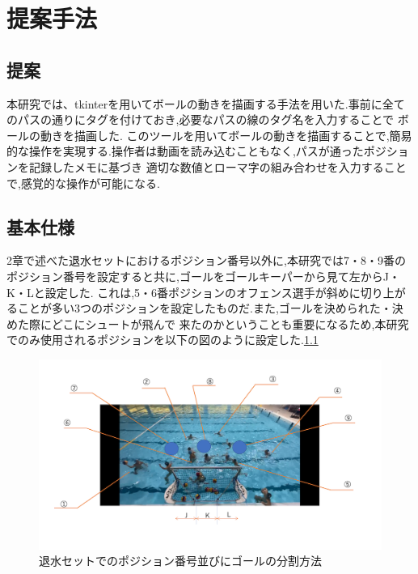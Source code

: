 \documentclass[../main.tex]{subfiles}
\begin{document}
\chapter{提案手法}

\section{提案}

本研究では、tkinterを用いてボールの動きを描画する手法を用いた.事前に全てのパスの通りにタグを付けておき,必要なパスの線のタグ名を入力することで
ボールの動きを描画した.
このツールを用いてボールの動きを描画することで,簡易的な操作を実現する.操作者は動画を読み込むこともなく,パスが通ったポジションを記録したメモに基づき
適切な数値とローマ字の組み合わせを入力することで,感覚的な操作が可能になる.

\section{基本仕様}

2章で述べた退水セットにおけるポジション番号以外に,本研究では7・8・9番のポジション番号を設定すると共に,ゴールをゴールキーパーから見て左からJ・K・Lと設定した.
これは,5・6番ポジションのオフェンス選手が斜めに切り上がることが多い3つのポジションを設定したものだ.また,ゴールを決められた・決めた際にどこにシュートが飛んで
来たのかということも重要になるため,本研究でのみ使用されるポジションを以下の図のように設定した.\ref{img:ExclusionNO}

\begin{figure}[ht]
    \begin{center}
        \includegraphics{img/02.png}
        \caption{退水セットでのポジション番号並びにゴールの分割方法}
        \label{img:ExclusionNO}
    \end{center}
\end{figure}
\end{document}

